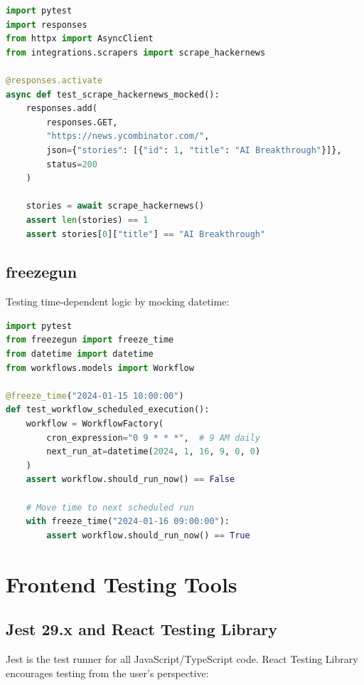 \documentclass{report}
\begin{document}
\begin{lstlisting}[language=Python, caption=Mocking external HTTP calls with responses]
import pytest
import responses
from httpx import AsyncClient
from integrations.scrapers import scrape_hackernews

@responses.activate
async def test_scrape_hackernews_mocked():
    responses.add(
        responses.GET,
        "https://news.ycombinator.com/",
        json={"stories": [{"id": 1, "title": "AI Breakthrough"}]},
        status=200
    )
    
    stories = await scrape_hackernews()
    assert len(stories) == 1
    assert stories[0]["title"] == "AI Breakthrough"
\end{lstlisting}

\subsection{freezegun}

Testing time-dependent logic by mocking datetime:

\begin{lstlisting}[language=Python, caption=Mocking time with freezegun]
import pytest
from freezegun import freeze_time
from datetime import datetime
from workflows.models import Workflow

@freeze_time("2024-01-15 10:00:00")
def test_workflow_scheduled_execution():
    workflow = WorkflowFactory(
        cron_expression="0 9 * * *",  # 9 AM daily
        next_run_at=datetime(2024, 1, 16, 9, 0, 0)
    )
    assert workflow.should_run_now() == False
    
    # Move time to next scheduled run
    with freeze_time("2024-01-16 09:00:00"):
        assert workflow.should_run_now() == True
\end{lstlisting}

\section{Frontend Testing Tools}

\subsection{Jest 29.x and React Testing Library}

Jest is the test runner for all JavaScript/TypeScript code. React Testing Library encourages testing from the user's perspective:
\end{document}
